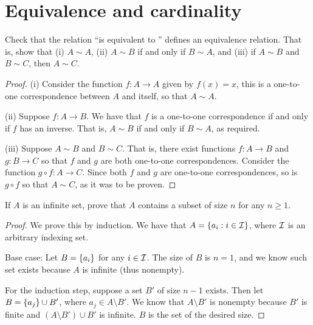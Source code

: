 \section{Equivalence and cardinality}


\begin{exercise}{1}
Check that the relation ``is equivalent to '' defines an equivalence relation. That is, show that (i) $A\sim A$, (ii) $A\sim B$ if and only if $B\sim A$, and (iii) if $A\sim B$ and $B\sim C$, then $A\sim C$.
\end{exercise}
\begin{proof}
(i) Consider the function $f:A\to A$ given by $f(x)=x$, this is a one-to-one correspondence between $A$ and itself, so that $A\sim A$.

(ii) Suppose $f:A\to B$. We have that $f$ is a one-to-one correspondence if and only if $f$ has an inverse. That is, $A\sim B$ if and only if $B\sim A$, as required.

(iii) Suppose $A\sim B$ and $B\sim C$. That is, there exist functions $f:A\to B$ and $g:B\to C$ so that $f$ and $g$ are both one-to-one correspondences. Consider the function $g\circ f:A\to C$. Since both $f$ and $g$ are one-to-one correspondences, so is $g\circ f$ so that $A\sim C$, as it was to be proven.
\end{proof} 

\begin{exercise}{2}
If $A$ is an infinite set, prove that $A$ contains a subset of size $n$ for any $n\geq 1$.
\end{exercise}
\begin{proof}
We prove this by induction. We have that $A=\{a_i: i\in\mathcal{I}\}$, where $\mathcal{I}$ is an arbitrary indexing set. 

Base case: Let $B=\{a_i\}$ for any $i\in\mathcal{I}$. The size of $B$ is $n=1$, and we know such set exists because $A$ is infinite (thus nonempty).

For the induction step, suppose a set $B'$ of size $n-1$ exists. Then let $B=\{a_j\}\cup B'$, where $a_j\in A\setminus B'$. We know that $A\setminus B'$ is nonempty because $B'$ is finite and $(A\setminus B')\cup B'$ is infinite. $B$ is the set of the desired size.
\end{proof} 

